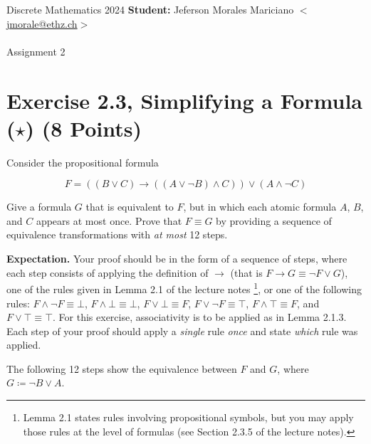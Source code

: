 \documentclass[unicode,11pt,a4paper,oneside,numbers=endperiod,openany]{scrartcl}
\begin{document}
\setassignment
{}

\serieheader
{Discrete Mathematics}
{2024}
{%
\textbf{Student:} Jeferson Morales Mariciano 
\href{mailto:jmorale@ethz.ch}{\(<\)jmorale@ethz.ch\(>\)} \\\\}
{\vspace{-1cm}}%
{Assignment 2}{}

\section*{Exercise 2.3, Simplifying a Formula (\(\star\)) \hfill (8 Points)}

Consider the propositional formula

\[
F = \left( (B \lor C) \to ((A \lor \neg B) \land C) \right) \lor (A \land \neg C)
\]

\noindent Give a formula \( G \) that is equivalent to \( F \), but in which each atomic formula \( A \), \( B \), and \( C \)
appears at most once. Prove that \( F \equiv G \) by providing a sequence of equivalence transformations 
with \textit{at most} 12 steps.

\noindent \textbf{Expectation.} 
Your proof should be in the form of a sequence of steps, where each step
consists of applying the definition of \( \to \) 
(that is \( F \to G \equiv \neg F \lor G \)), 
one of the rules given in Lemma 2.1 of the lecture notes 
\footnote{Lemma 2.1 states rules involving propositional symbols, 
but you may apply those rules at the level of formulas 
(see Section 2.3.5 of the lecture notes).}, 
or one of the following rules: 
\( F \land \neg F \equiv \bot \), 
\( F \land \bot \equiv \bot \), 
\( F \lor \bot \equiv F \), 
\( F \lor \neg F \equiv \top \), 
\( F \land \top \equiv F \), 
and \( F \lor \top \equiv \top \). 
For this exercise, associativity is to be applied as in Lemma 2.1.3. 
Each step of your proof should apply a \textit{single} rule \textit{once} 
and state \textit{which} rule was applied.
\\\newline

The following 12 steps show the equivalence between \( F \) and \( G \), 
where \( G  \coloneq \neg B \lor A \).
\end{document}
